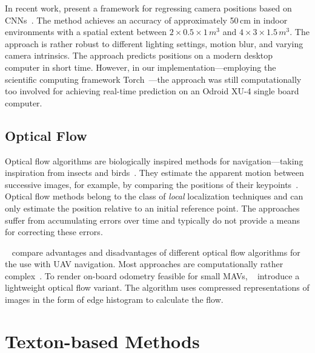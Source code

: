\documentclass[11pt]{report}
\begin{document}
In recent work, \citeauthor{kendall2015posenet} present a framework
for regressing camera positions based on
CNNs~\cite{kendall2015posenet}. The method achieves an accuracy of
approximately 50\,cm in indoor environments with a spatial extent
between $2 \times 0.5 \times 1\,m^3$ and $4 \times 3 \times
1.5\,m^3$. The approach is rather robust to different lighting
settings, motion blur, and varying camera intrinsics. The approach
predicts positions on a modern desktop computer in short
time. However, in our implementation---employing the scientific
computing framework Torch~\cite{collobert2011torch7}---the approach
was still computationally too involved for achieving real-time
prediction on an Odroid XU-4 single board computer.

\subsection{Optical Flow}
\label{sec:opticalflow}

Optical flow algorithms are biologically inspired methods for
navigation---taking inspiration from insects and
birds~\cite{ruffier2003bio}. They estimate the apparent motion between
successive images, for example, by comparing the positions of their
keypoints~\cite{chao2013survey}.
Optical flow methods belong to the class of \emph{local} localization
techniques and can only estimate the position relative to an initial
reference point. The approaches suffer from accumulating errors over
time and typically do not provide a means for correcting these errors.

\citeauthor{chao2013survey}~\cite{chao2013survey} compare advantages
and disadvantages of different optical flow algorithms for the use
with UAV navigation. Most approaches are computationally rather
complex~\cite{mcguire2016local}. To render on-board odometry feasible
for small MAVs, \citeauthor{mcguire2016local}~\cite{mcguire2016local}
introduce a lightweight optical flow variant. The algorithm uses
compressed representations of images in the form of edge histogram to
calculate the flow.

\section{Texton-based Methods}
\label{sec:textonbasedapproaches}
\end{document}

